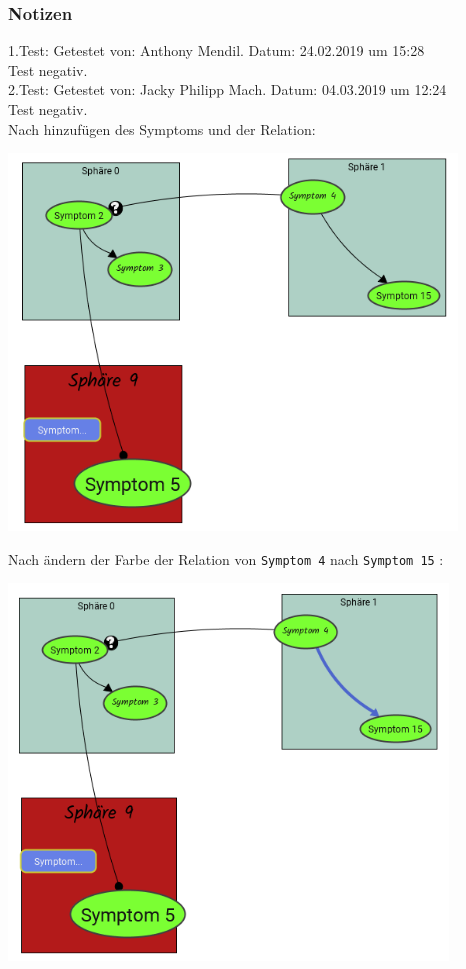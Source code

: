 \documentclass[enabledeprecatedfontcommands]{scrartcl}
\begin{document}
\subsubsection{Notizen}
1.Test: Getestet von: Anthony Mendil. Datum: 24.02.2019 um 15:28 \\
Test negativ. \\
2.Test: Getestet von: Jacky Philipp Mach. Datum: 04.03.2019 um 12:24 \\
Test negativ.\\
Nach hinzufügen des Symptoms und der Relation: 
\begin{center}
\includegraphics[height=10cm]{3_33vorher.PNG}
\end{center}
Nach ändern der Farbe der Relation von \texttt{Symptom 4} nach \texttt{Symptom 15} :
\begin{center}
\includegraphics[height=10cm]{3_33.PNG}
\end{center}
\end{document}
